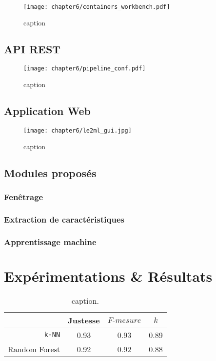 \begin{figure}[H]
	\centering
	\texttt{[image: chapter6/containers\_workbench.pdf]}
        \caption{caption}
	\label{fig:containers_workbench}
\end{figure}

\subsection{API REST}

\begin{figure}[H]
	\centering
	\texttt{[image: chapter6/pipeline\_conf.pdf]}
        \caption{caption}
	\label{fig:pipeline_conf}
\end{figure}

\subsection{Application Web}

\begin{figure}[H]
	\centering
	\texttt{[image: chapter6/le2ml\_gui.jpg]}
        \caption{caption}
	\label{fig:le2ml_gui}
\end{figure}

\subsection{Modules proposés}

\subsubsection{Fenêtrage}

\subsubsection{Extraction de caractéristiques}

\subsubsection{Apprentissage machine}

\section{Expérimentations \& Résultats}

\begin{table}[H]
    \centering
    \caption{caption.}
    \label{tab:previous_results}
    \begin{tabular}{@{}rccc@{}}
      \toprule
      \multicolumn{1}{l}{}  & Justesse  &  $F\mbox{-} mesure$  & $k$    \\ \midrule
      \texttt{k-NN}         & 0.93      & 0.93                & 0.89    \\
      Random Forest         & 0.92      & 0.92                & 0.88    \\ \bottomrule
    \end{tabular}
\end{table}

